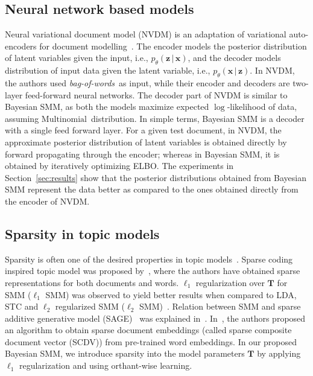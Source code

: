 \documentclass[journal]{IEEEtran}
\newcommand{\mb}[1]{\bm{#1}}
\newcommand{\Mul}{\(\mathrm{Multinomial}\)}
\newcommand{\bow}{\textit{bag-of-words}}
\begin{document}
\subsection{Neural network based models}
\label{ssec:nvdm}
Neural variational document model (NVDM) is an adaptation of variational auto-encoders for document modelling~\cite{NVI:2016}. The encoder models the posterior distribution of latent variables given the input, i.e., \(p_{\theta}(\mb{z} \,|\, \mb{x})\), and the decoder models distribution of input data given the latent variable, i.e., \(p_{\theta}(\mb{x} \,|\, \mb{z})\).  In NVDM, the authors used \bow~as input, while their encoder and decoders are two-layer feed-forward neural networks. The decoder part of NVDM is similar to Bayesian SMM, as both the models maximize expected \(\log\)-likelihood of data, assuming \Mul~distribution. In simple terms, Bayesian SMM is a decoder with a single feed forward layer. For a given test document, in NVDM, the approximate posterior distribution of latent variables is obtained directly by forward propagating through the encoder; whereas in Bayesian SMM, it is obtained by iteratively optimizing ELBO.
The experiments in Section~\ref{sec:results} show that the posterior distributions obtained from Bayesian SMM represent the data better as compared to the ones obtained directly from the encoder of NVDM. 

\subsection{Sparsity in topic models}
\label{sec_sparsity_tm}
Sparsity is often one of the desired properties in topic 
models~\cite{SAGE:2011,Biksha:2007:Sparse}. Sparse coding inspired topic model 
was proposed by~\cite{Zhu:2011:STC}, where the authors have obtained sparse 
representations for both documents and words. \(\ell_1\) regularization over 
\(\mb{T}\) for SMM (\(\ell_1\) SMM) was observed to yield better results when 
compared to LDA, STC and \(\ell_2\) regularized SMM (\(\ell_2\) 
SMM)~\cite{Kesiraju:2016:SMM}. Relation between SMM and sparse additive 
generative model (SAGE)~\cite{SAGE:2011} was explained in~\cite{May:2015:mivec}.
In~\cite{Mekala:2017:SCDV}, the authors proposed an algorithm to obtain sparse 
document embeddings (called sparse composite document vector (SCDV)) from 
pre-trained word embeddings. In our proposed Bayesian SMM, we introduce 
sparsity into the model parameters \(\mb{T}\) by applying \(\ell_1\) 
regularization and using orthant-wise learning.
\end{document}
